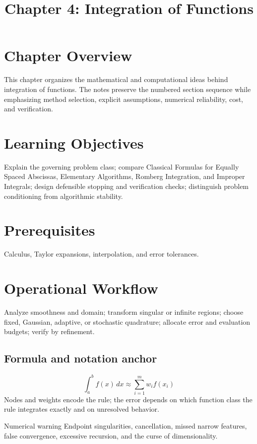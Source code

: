 \documentclass[10pt,letterpaper]{article}
\title{Chapter 4: Integration of Functions}
\author{}
\date{}
\begin{document}
\maketitle

\section*{Chapter Overview}
This chapter organizes the mathematical and computational ideas behind integration of functions. The notes preserve the numbered section sequence while emphasizing method selection, explicit assumptions, numerical reliability, cost, and verification.

\section*{Learning Objectives}
Explain the governing problem class; compare Classical Formulas for Equally Spaced Abscissas, Elementary Algorithms, Romberg Integration, and Improper Integrals; design defensible stopping and verification checks; distinguish problem conditioning from algorithmic stability.

\section*{Prerequisites}
Calculus, Taylor expansions, interpolation, and error tolerances.

\section*{Operational Workflow}
Analyze smoothness and domain; transform singular or infinite regions; choose fixed, Gaussian, adaptive, or stochastic quadrature; allocate error and evaluation budgets; verify by refinement.

\subsection*{Formula and notation anchor}
\[
\int_a^b f(x)\,dx\approx\sum_{i=1}^{m} w_i f(x_i)
\]
Nodes and weights encode the rule; the error depends on which function class the rule integrates exactly and on unresolved behavior.

\begin{warnbox}{Numerical warning}
Endpoint singularities, cancellation, missed narrow features, false convergence, excessive recursion, and the curse of dimensionality.
\end{warnbox}
\end{document}
